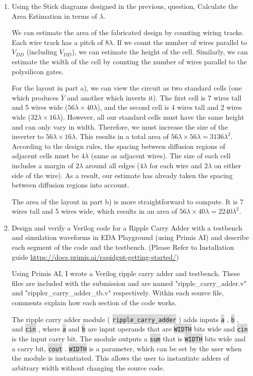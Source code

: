 \documentclass[fleqn]{article}
\newcommand{\code}[1]{%
	\colorbox{Gainsboro}{\texttt{#1}}%
}
\begin{document}
\begin{enumerate}
		\item Using the Stick diagrams designed in the previous, question, Calculate the Area Estimation in terms of $\lambda$.
			
		We can estimate the area of the fabricated design by counting wiring tracks. Each wire track has a pitch of $8\lambda$. If we count the number of wires parallel to $V_{DD}$ (including $V_{DD}$), we can estimate the height of the cell. Similarly, we can estimate the width of the cell by counting the number of wires parallel to the polysilicon gates.
		
		For the layout in part a), we can view the circuit as two standard cells (one which produces $\bar{Y}$ and another which inverts it). The first cell is 7 wires tall and 5 wires wide ($56 \lambda \times 40 \lambda$), and the second cell is 4 wires tall and 2 wires wide ($32 \lambda \times 16 \lambda$). However, all our standard cells must have the same height and can only vary in width. Therefore, we must increase the size of the inverter to $56 \lambda \times 16 \lambda$. This results in a total area of $56 \lambda \times 56 \lambda = 3136 \lambda^2$. According to the design rules, the spacing between diffusion regions of adjacent cells must be $4\lambda$ (same as adjacent wires). The size of each cell includes a margin of $2\lambda$ around all edges ($4\lambda$ for each wire and $2\lambda$ on either side of the wire). As a result, our estimate has already taken the spacing between diffusion regions into account.
		
		The area of the layout in part b) is more straightforward to compute. It is 7 wires tall and 5 wires wide, which results in an area of $56 \lambda \times 40 \lambda = 2240\lambda^2$.
		 
		 \item Design and verify a Verilog code for a Ripple Carry Adder with a testbench and simulation waveforms in EDA Playground (using Primis AI) and describe each segment of the code and the testbench. (Please Refer to Installation guide \url{https://docs.primis.ai/rapidgpt-getting-started/})
		 
		 \pagebreak
		 
		 Using Primis AI, I wrote a Verilog ripple carry adder and testbench. These files are included with the submission and are named "ripple\_carry\_adder.v" and "rippler\_carry\_adder\_tb.v" respectively. Within each source file, comments explain how each section of the code works.
		 
		 The ripple carry adder module (\code{ripple\_carry\_adder}) adds inputs \code{a}, \code{b}, and \code{cin}, where \code{a} and \code{b} are input operands that are \code{WIDTH} bits wide and \code{cin} is the input carry bit. The module outputs a \code{sum} that is \code{WIDTH} bits wide and a carry bit, \code{cout}. \code{WIDTH} is a parameter, which can be set by the user when the module is instantiated. This allows the user to instantiate adders of arbitrary width without changing the source code.
		 

\end{enumerate}
\end{document}
